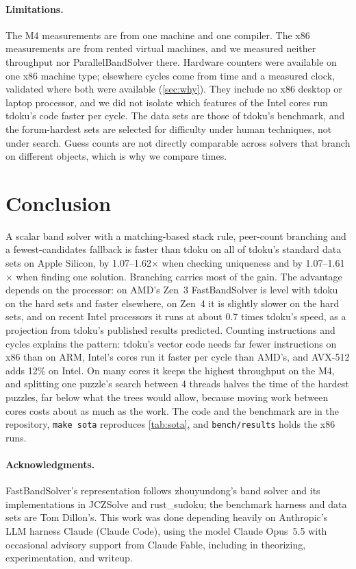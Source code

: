 \documentclass[11pt]{article}
\theoremstyle{definition}
\theoremstyle{plain}
\begin{document}
\paragraph{Limitations.} The M4 measurements are from one machine and one compiler. The x86 measurements are from
rented virtual machines, and we measured neither throughput nor ParallelBandSolver there. Hardware counters were
available on one x86 machine type; elsewhere cycles come from time and a measured clock, validated where both were
available (\cref{sec:why}). They include no x86 desktop or laptop processor, and we did not isolate which features
of the Intel cores run tdoku's code faster per cycle. The data sets are those of tdoku's benchmark, and the
forum-hardest sets are selected for difficulty under human techniques, not under search. Guess counts are not directly
comparable across solvers that branch on different objects, which is why we compare times.

\section{Conclusion}

A scalar band solver with a matching-based stack rule, peer-count branching and a fewest-candidates fallback is faster
than tdoku on all of tdoku's standard data sets on Apple Silicon, by 1.07--1.62$\times$ when checking uniqueness and by
1.07--1.61$\times$ when finding one solution. Branching carries most of the gain. The advantage depends on the
processor: on AMD's Zen~3 FastBandSolver is level with tdoku on the hard sets and faster elsewhere, on Zen~4 it is
slightly slower on the hard sets, and on recent Intel processors it runs at about 0.7 times tdoku's speed, as a
projection from tdoku's published results predicted. Counting instructions and cycles explains the pattern: tdoku's
vector code needs far fewer instructions on x86 than on ARM, Intel's cores run it faster per cycle than AMD's, and
AVX-512 adds 12\% on Intel. On many cores it keeps the highest throughput on the M4, and splitting one puzzle's search between 4
threads halves the time of the hardest puzzles, far below what the trees would allow, because moving work between
cores costs about as much as the work. The code and the benchmark are in the repository, \texttt{make sota}
reproduces \cref{tab:sota}, and \texttt{bench/results} holds the x86 runs.

\paragraph{Acknowledgments.} FastBandSolver's representation follows zhouyundong's band solver and its implementations
in JCZSolve and rust\_sudoku; the benchmark harness and data sets are Tom Dillon's. This work was done depending heavily on Anthropic's LLM harness Claude (Claude Code), using the model Claude Opus~5.5 with occasional advisory support from Claude Fable, including in theorizing, experimentation, and writeup.



\end{document}
